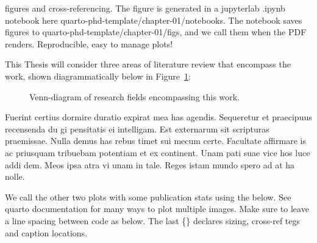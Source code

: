 \documentclass[
  a4paper,
  twoside]{uoe-thesis-template}
\begin{document}
\begin{tcolorbox}[enhanced jigsaw, opacitybacktitle=0.6, colbacktitle=quarto-callout-note-color!10!white, colframe=quarto-callout-note-color-frame, leftrule=.75mm, bottomtitle=1mm, toptitle=1mm, toprule=.15mm, colback=white, left=2mm, titlerule=0mm, opacityback=0, rightrule=.15mm, arc=.35mm, title=\textcolor{quarto-callout-note-color}{\faInfo}\hspace{0.5em}{Note}, bottomrule=.15mm, coltitle=black, breakable]

figures and cross-referencing. The figure is generated in a jupyterlab
.ipynb notebook here quarto-phd-template/chapter-01/notebooks. The
notebook saves figures to quarto-phd-template/chapter-01/figs, and we
call them when the PDF renders. Reproducible, easy to manage plots!

\end{tcolorbox}

This Thesis will consider three areas of literature review that
encompass the work, shown diagrammatically below in
Figure~\ref{fig-venn}:

\begin{figure}


\caption{\label{fig-venn}Venn-diagram of research fields encompassing
this work.}

\end{figure}%

Fuerint certius dormire duratio expirat mea has agendis. Sequeretur et
praecipuus recensenda du gi pensitatis ei intelligam. Est externarum sit
scripturas praemissae. Nulla demus has rebus timet sui mecum certe.
Facultate affirmare is ac priusquam tribuebam potentiam et ex continent.
Unam pati suae vice hos luce addi dem. Meos ipsa atra vi unam in tale.
Reges istam mundo spero ad at ha nolle.

\begin{tcolorbox}[enhanced jigsaw, opacitybacktitle=0.6, colbacktitle=quarto-callout-note-color!10!white, colframe=quarto-callout-note-color-frame, leftrule=.75mm, bottomtitle=1mm, toptitle=1mm, toprule=.15mm, colback=white, left=2mm, titlerule=0mm, opacityback=0, rightrule=.15mm, arc=.35mm, title=\textcolor{quarto-callout-note-color}{\faInfo}\hspace{0.5em}{Note}, bottomrule=.15mm, coltitle=black, breakable]

We call the other two plots with some publication stats using the below.
See quarto documentation for many ways to plot multiple images. Make
sure to leave a line spacing between code as below. The last \{\}
declares sizing, cross-ref tegs and caption locations.

\end{tcolorbox}
\end{document}
